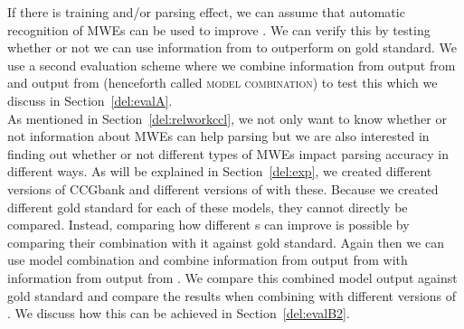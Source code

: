 \documentclass[output=paper]{langsci/langscibook}
\begin{document}
    \indent If there is training and/or parsing effect, we can assume that automatic recognition of MWEs can be used to improve . We can verify this by testing whether or not we can use information from {\modelB} to outperform {\modelA} on gold standard. We use a second evaluation scheme where we combine information from output from {\modelA} and output from {\modelB} (henceforth called \textsc{model combination}) to test this which we discuss in Section~\ref{del:evalA}. \\
    \indent As mentioned in Section~\ref{del:relworkccl}, we not only want to know whether or not information about MWEs can help  parsing but we are also interested in finding out whether or not different types of MWEs impact parsing accuracy in different ways. As will be explained in Section~\ref{del:exp}, we created different versions of CCGbank and different versions of {\modelB} with these. Because we created different gold standard for each of these models, they cannot directly be compared. Instead, comparing how different {\modelB}s can improve {\modelA} is possible by comparing their combination with it against gold standard. Again then we can use model combination and combine information from output from {\modelA} with information from output from {\modelB}. We compare this combined model output against gold standard and compare the results when combining {\modelA} with different versions of {\modelB}. We discuss how this can be achieved in Section~\ref{del:evalB2}. 
\end{document}

